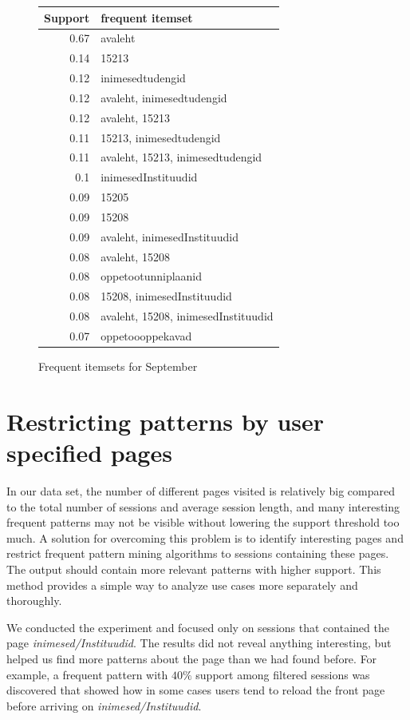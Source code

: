 \documentclass[12pt, english,a4paper]{article}
\begin{document}
\begin{figure}[H]
  \centering
\begin{tabular}{ r | l }
Support & frequent itemset \\ \hline
0.67 & avaleht \\ \hline
0.14 & 15213 \\ \hline
0.12 & inimesedtudengid \\ \hline
0.12 & avaleht, inimesedtudengid \\ \hline
0.12 & avaleht, 15213 \\ \hline
0.11 & 15213, inimesedtudengid \\ \hline
0.11 & avaleht, 15213, inimesedtudengid \\ \hline
0.1 & inimesedInstituudid \\ \hline
0.09 & 15205 \\ \hline
0.09 & 15208 \\ \hline
0.09 & avaleht, inimesedInstituudid \\ \hline
0.08 & avaleht, 15208 \\ \hline
0.08 & oppetootunniplaanid \\ \hline
0.08 & 15208, inimesedInstituudid \\ \hline
0.08 & avaleht, 15208, inimesedInstituudid \\ \hline
0.07 & oppetoooppekavad \\ \hline
\end{tabular}
  \caption{Frequent itemsets for September }
  \label{sep2}
\end{figure}


\section{Restricting patterns by user specified pages}
In our data set, the number of different pages visited is relatively big compared to the total number of sessions and average session length, and many interesting frequent patterns may not be visible without lowering the support threshold too much. A solution for overcoming this problem is to identify interesting pages and restrict frequent pattern mining algorithms to sessions containing these pages. The output should contain more relevant patterns with higher support. This method provides a simple way to analyze use cases more separately and thoroughly.

We conducted the experiment and focused only on sessions that contained the page \emph{inimesed/Instituudid}. The results did not reveal anything interesting, but helped us find more patterns about the page than we had found before. For example, a frequent pattern with $40\%$ support among filtered sessions was discovered that showed how in some cases users tend to reload the front page before arriving on \emph{inimesed/Instituudid}.
\end{document}
